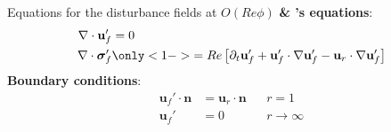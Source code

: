 \documentclass{sintefbeamer}
\begin{document}
\begin{frame}
  {Equations for the disturbance fields at $O(Re \phi)$}
  \textbf{\citet{maxey1983equation} \& \citet{gatignol1983faxen}'s equations}: 
  \begin{align*}
    \div \textbf{u}_f' &= 0 \\
      \div \bm\sigma_f' 
      &\only<1->{ =
      Re \left[
        \pddt \textbf{u}_f'
        + \textbf{u}_f'\cdot \grad\textbf{u}_f' 
        -  \textbf{u}_r\cdot \grad\textbf{u}_f'
    \right]}
\end{align*}
\textbf{Boundary conditions}:
\begin{align*}  
  \textbf{u}_f'\cdot \textbf{n} &= \textbf{u}_r \cdot \textbf{n} 
  && 
  r = 1 \\
  \textbf{u}_f' &= 0 && r \to \infty
\end{align*}

\end{frame}






\end{document}
